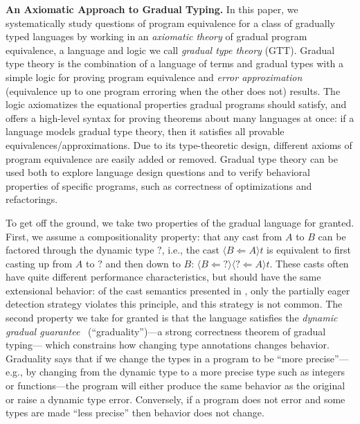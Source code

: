 \documentclass[acmsmall,screen,12pt]{acmart}
\newcommand{\dyn}{{?}}
\newcommand{\obcast}[2]{\langle{#1}\Leftarrow{#2}\rangle}
\begin{document}
\textbf{An Axiomatic Approach to Gradual Typing.}
In this paper, we systematically study questions of program equivalence
for a class of gradually typed languages by working in an
\emph{axiomatic theory} of gradual program equivalence, a language and
logic we call \emph{gradual type theory} (GTT). 
%
Gradual type theory is the combination of a language of terms and
gradual types with a simple logic for proving program equivalence and
\emph{error approximation} (equivalence up to one program erroring when
the other does not) results.
%
The logic axiomatizes the equational properties gradual
programs should satisfy, and offers a high-level syntax for proving
theorems about many languages at once:
if a language models gradual type theory, then it satisfies all
provable equivalences/approximations.
%
Due to its type-theoretic design, different axioms of program
equivalence are easily added or removed.
%
Gradual type theory can be used both to explore language design questions and
to verify behavioral properties of specific programs, such as correctness of
optimizations and refactorings.

To get off the ground, we take two properties of the gradual language
for granted.
%
First, we assume a compositionality property: that any cast from $A$
to $B$ can be factored through the dynamic type $\dyn$, i.e., the cast
$\obcast{B}{A}{t}$ is equivalent to first casting up from $A$ to
$\dyn$ and then down to $B$: $\obcast{B}{\dyn}\obcast{\dyn}{A} t$.
%
These casts often have quite different performance characteristics,
but should have the same extensional behavior: of the cast semantics
presented in \citet{siek+09designspace}, only the partially eager
detection strategy violates this principle, and this strategy is not
common.
%
The second property we take for granted is that the language satisfies
the \emph{dynamic gradual guarantee}~\cite{refined} (``graduality'')---a
strong correctness theorem of gradual typing--- which constrains how
changing type annotations changes behavior.  Graduality says that if we
change the types in a program to be ``more precise''---e.g., by changing
from the dynamic type to a more precise type such as integers or
functions---the program will either produce the same behavior as the
original or raise a dynamic type error.  Conversely, if a program does
not error and some types are made ``less precise'' then behavior does
not change.  

\end{document}
